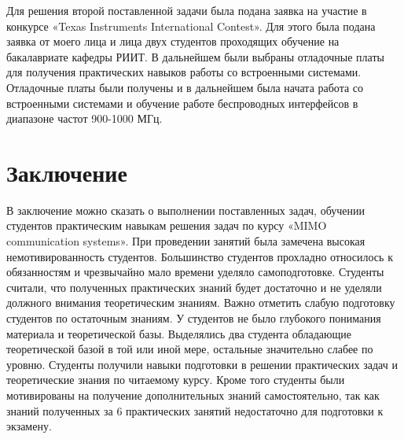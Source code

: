 \documentclass
[   twoside=false,    
    fontsize=14pt,     
    DIV=15,           
    BCOR=17mm,         
    headsepline, 
    footsepline, 
    open=right,        
    paper=a4,          
    abstract=true,     
    listof=totoc,     
    bibliography=totoc,
    titlepage,       
    headinclude=true,  
    footinclude=false, 
    numbers=noenddot   
]   {scrreprt}      %
\begin{document}
Для решения второй поставленной задачи была подана заявка на участие в конкурсе «Texas Instruments International Contest». Для этого была подана заявка от моего лица и лица двух студентов проходящих обучение на бакалавриате кафедры РИИТ. В дальнейшем были выбраны отладочные платы для получения практических навыков работы со встроенными системами. Отладочные платы были получены и в дальнейшем была начата работа со встроенными системами и обучение работе беспроводных интерфейсов в диапазоне частот 900-1000 МГц.
\chapter{Заключение}
В заключение можно сказать о выполнении поставленных задач, обучении студентов практическим навыкам решения задач по курсу «MIMO communication systems». При проведении занятий была замечена высокая немотивированность студентов. Большинство студентов прохладно относилось к обязанностям и чрезвычайно мало времени уделяло самоподготовке. Студенты считали, что полученных практических знаний будет достаточно и не уделяли должного внимания теоретическим знаниям. Важно отметить слабую подготовку студентов по остаточным знаниям. У студентов не было глубокого понимания материала и теоретической базы.  Выделялись два студента обладающие теоретической базой в той или иной мере, остальные значительно слабее по уровню. Студенты получили навыки подготовки в решении практических задач и теоретические знания по читаемому курсу. Кроме того студенты были мотивированы на получение дополнительных знаний самостоятельно, так как знаний полученных за 6 практических занятий недостаточно для подготовки к экзамену.

\cleardoublepage
  
 
\cleardoublepage
\end{document}
